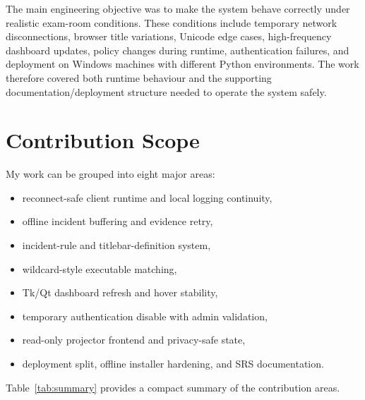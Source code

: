 \documentclass[conference]{IEEEtran}
\begin{document}
The main engineering objective was to make the system behave correctly under realistic exam-room conditions. These conditions include temporary network disconnections, browser title variations, Unicode edge cases, high-frequency dashboard updates, policy changes during runtime, authentication failures, and deployment on Windows machines with different Python environments. The work therefore covered both runtime behaviour and the supporting documentation/deployment structure needed to operate the system safely.

\section{Contribution Scope}

My work can be grouped into eight major areas:

\begin{itemize}
    \item reconnect-safe client runtime and local logging continuity,
    \item offline incident buffering and evidence retry,
    \item incident-rule and titlebar-definition system,
    \item wildcard-style executable matching,
    \item Tk/Qt dashboard refresh and hover stability,
    \item temporary authentication disable with admin validation,
    \item read-only projector frontend and privacy-safe state,
    \item deployment split, offline installer hardening, and SRS documentation.
\end{itemize}

Table~\ref{tab:summary} provides a compact summary of the contribution areas.
\end{document}
